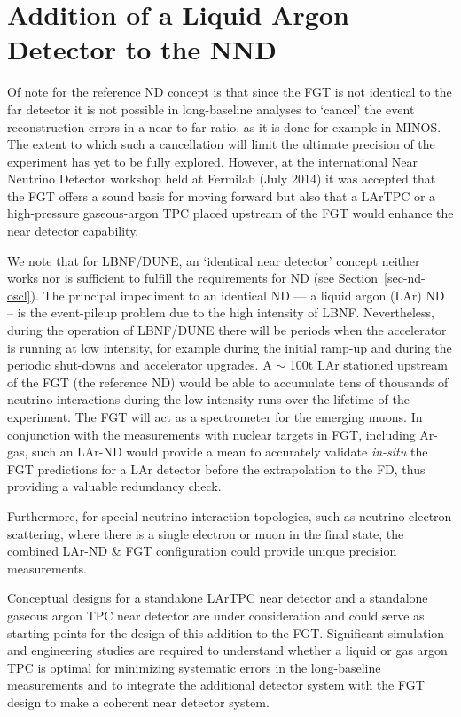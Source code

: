 \section{Addition of a Liquid Argon Detector to the NND}
\label{sec:detectors-nd-alt}

Of note for the reference ND concept is that since the FGT is not
identical to the far detector it is not possible in long-baseline
analyses to `cancel' the event reconstruction errors in a near to far
ratio, as it is done for example in MINOS.  The extent to which such a
cancellation will limit the ultimate precision of the experiment has
yet to be fully explored.  However, at the international Near Neutrino
Detector workshop held at Fermilab (July 2014) it was accepted that
the FGT offers a sound basis for moving forward but also that a LArTPC
or a high-pressure gaseous-argon TPC placed upstream of the FGT would
enhance the near detector capability.


We note that for LBNF/DUNE, an `identical near detector' concept
neither works nor is sufficient to fulfill the requirements for ND
(see Section~\ref{sec-nd-oscl}). The principal impediment to an
identical ND --- a liquid argon (LAr) ND -- is the event-pileup problem
due to the high intensity of LBNF. Nevertheless, during the operation
of LBNF/DUNE there will be periods when the accelerator is running at
low intensity, for example during the initial ramp-up and during the
periodic shut-downs and accelerator upgrades. A $\sim$ 100t LAr
stationed upstream of the FGT (the reference ND) would be able to
accumulate tens of thousands of neutrino interactions during the
low-intensity runs over the lifetime of the experiment.  The FGT will
act as a spectrometer for the emerging muons. In conjunction with the
measurements with nuclear targets in FGT, including Ar-gas, such an
LAr-ND would provide a mean to accurately validate {\em in-situ} the
FGT predictions for a LAr detector before the extrapolation to the FD,
thus providing a valuable redundancy check.

Furthermore, for special neutrino interaction topologies, such as
neutrino-electron scattering, where there is a single electron or muon
in the final state, the combined LAr-ND \& FGT configuration could
provide unique precision measurements.

Conceptual designs for a standalone LArTPC near detector and a
standalone gaseous argon TPC near detector are under consideration and
could serve as starting points for the design of this addition to the
FGT.  Significant simulation and engineering studies are required to
understand whether a liquid or gas argon TPC is optimal for minimizing
systematic errors in the long-baseline measurements and to integrate
the additional detector system with the FGT design to make a coherent
near detector system.



